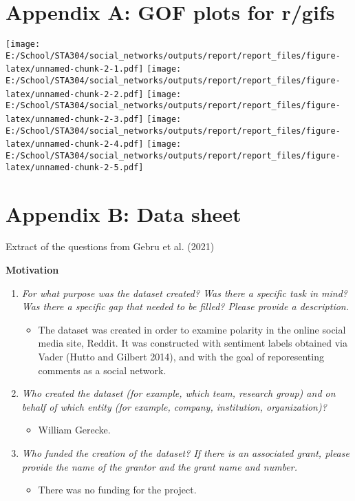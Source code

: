 \documentclass[
]{article}
\providecommand{\tightlist}{%
  \setlength{\itemsep}{0pt}\setlength{\parskip}{0pt}}
\begin{document}
\newpage

\hypertarget{appendix-a-gof-plots-for-rgifs}{%
\section{Appendix A: GOF plots for r/gifs}\label{appendix-a-gof-plots-for-rgifs}}

\texttt{[image: E:/School/STA304/social\_networks/outputs/report/report\_files/figure-latex/unnamed-chunk-2-1.pdf]} \texttt{[image: E:/School/STA304/social\_networks/outputs/report/report\_files/figure-latex/unnamed-chunk-2-2.pdf]} \texttt{[image: E:/School/STA304/social\_networks/outputs/report/report\_files/figure-latex/unnamed-chunk-2-3.pdf]} \texttt{[image: E:/School/STA304/social\_networks/outputs/report/report\_files/figure-latex/unnamed-chunk-2-4.pdf]} \texttt{[image: E:/School/STA304/social\_networks/outputs/report/report\_files/figure-latex/unnamed-chunk-2-5.pdf]}

\newpage

\hypertarget{appendix-b-data-sheet}{%
\section{Appendix B: Data sheet}\label{appendix-b-data-sheet}}

Extract of the questions from Gebru et al. (2021)

\textbf{Motivation}

\begin{enumerate}
\def\labelenumi{\arabic{enumi}.}
\tightlist
\item
  \emph{For what purpose was the dataset created? Was there a specific task in mind? Was there a specific gap that needed to be filled? Please provide a description.}

  \begin{itemize}
  \tightlist
  \item
    The dataset was created in order to examine polarity in the online social media site, Reddit. It was constructed with sentiment labels obtained via Vader (Hutto and Gilbert 2014), and with the goal of reporesenting comments as a social network.
  \end{itemize}
\item
  \emph{Who created the dataset (for example, which team, research group) and on behalf of which entity (for example, company, institution, organization)?}

  \begin{itemize}
  \tightlist
  \item
    William Gerecke.
  \end{itemize}
\item
  \emph{Who funded the creation of the dataset? If there is an associated grant, please provide the name of the grantor and the grant name and number.}

  \begin{itemize}
  \tightlist
  \item
    There was no funding for the project.
  \end{itemize}
\end{enumerate}
\end{document}
